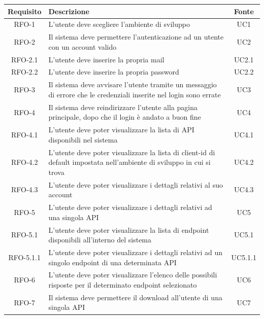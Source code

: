 
\begin{center}
\label{tab:requisiti-funzionali}
\begin{longtable}{|c|p{}|c|}
\hline
\textbf{Requisito} & \textbf{Descrizione} & \textbf{Fonte}\\
\hline
RFO-1 &L'utente deve scegliere l'ambiente di sviluppo & UC1 \\
\hline
RFO-2 &Il sistema deve permettere l'autenticazione ad un utente con un account valido & UC2 \\
\hline
RFO-2.1 & L'utente deve inserire la propria mail & UC2.1 \\
\hline
RFO-2.2 & L'utente deve inserire la propria password & UC2.2 \\
\hline
RFO-3 &Il sistema deve avvisare l'utente tramite un messaggio di errore che le credenziali inserite nel login sono errate & UC3 \\
\hline
RFO-4 &Il sistema deve reindirizzare l'utente alla pagina principale, dopo che il login è andato a buon fine & UC4 \\
\hline
RFO-4.1 &L'utente deve poter visualizzare la lista di API disponibili nel sistema & UC4.1 \\
\hline
RFO-4.2 &L'utente deve poter visualizzare la lista di client-id di default impostata nell'ambiente di sviluppo in cui si trova & UC4.2 \\
\hline
RFO-4.3 &L'utente deve poter visualizzare i dettagli relativi al suo account & UC4.3 \\
\hline
RFO-5 &L'utente deve poter visualizzare i dettagli relativi ad una singola API  & UC5 \\
\hline
RFO-5.1 &L'utente deve poter visualizzare la lista di endpoint disponibili all'interno del sistema & UC5.1 \\
\hline
RFO-5.1.1 &L'utente deve poter visualizzare i dettagli relativi ad un singolo endpoint di una determinata API & UC5.1.1 \\
\hline
RFO-6 &L'utente deve poter visualizzare l'elenco delle possibili risposte per il determinato endpoint selezionato & UC6 \\
\hline
RFO-7 &Il sistema deve permettere il download all'utente di una singola API & UC7 \\

\end{longtable}
\end{center}

